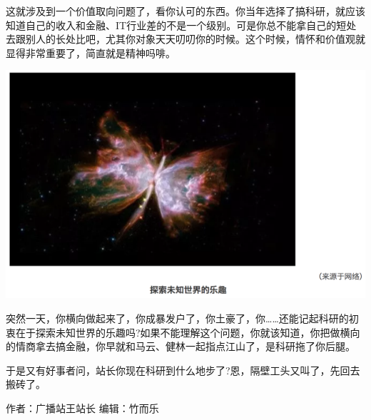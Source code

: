 \documentclass[]{book}
\begin{document}
这就涉及到一个价值取向问题了，看你认可的东西。你当年选择了搞科研，就应该知道自己的收入和金融、IT行业差的不是一个级别。可是你总不能拿自己的短处去跟别人的长处比吧，尤其你对象天天叨叨你的时候。这个时候，情怀和价值观就显得非常重要了，简直就是精神吗啡。

\includegraphics[width=8.33in]{images/kq3}

突然一天，你横向做起来了，你成暴发户了，你土豪了，你\ldots{}\ldots{}还能记起科研的初衷在于探索未知世界的乐趣吗?如果不能理解这个问题，你就该知道，你把做横向的情商拿去搞金融，你早就和马云、健林一起指点江山了，是科研拖了你后腿。

于是又有好事者问，站长你现在科研到什么地步了?恩，隔壁工头又叫了，先回去搬砖了。

作者：广播站王站长 编辑：竹而乐


\end{document}
